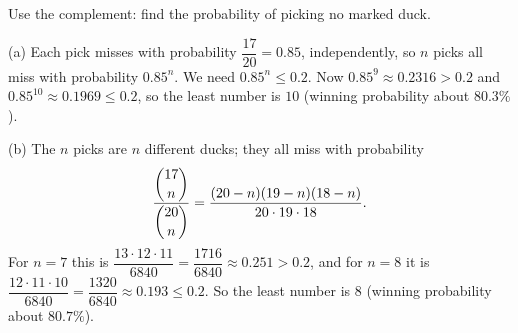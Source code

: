 Use the complement: find the probability of picking no marked duck.

(a) Each pick misses with probability $\dfrac{17}{20}=0.85$, independently, so $n$ picks all miss with probability $0.85^n$. We need $0.85^n\le0.2$. Now $0.85^9\approx0.2316>0.2$ and $0.85^{10}\approx0.1969\le0.2$, so the least number is $\boxed{10}$ (winning probability about $80.3\%$).

(b) The $n$ picks are $n$ different ducks; they all miss with probability
\[
\dfrac{\dbinom{17}{n}}{\dbinom{20}{n}}=\dfrac{(20-n)(19-n)(18-n)}{20\cdot19\cdot18}.
\]
For $n=7$ this is $\dfrac{13\cdot12\cdot11}{6840}=\dfrac{1716}{6840}\approx0.251>0.2$, and for $n=8$ it is $\dfrac{12\cdot11\cdot10}{6840}=\dfrac{1320}{6840}\approx0.193\le0.2$. So the least number is $\boxed{8}$ (winning probability about $80.7\%$).
